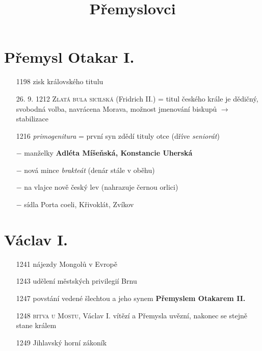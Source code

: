 \documentclass{article}
\title{\vspace{-2cm}Přemyslovci\vspace{-1.7cm}}
\date{}
\author{}
\begin{document}
\maketitle
\section*{Přemysl Otakar I.}
\begin{itemize}
    \vspace{-0.5em}
    \setlength\itemsep{0.15em}
    \item[1198] zisk královského titulu
    \item[26. 9. 1212] \textsc{Zlatá bula sicilská} (Fridrich II.) = titul českého krále je dědičný, svobodná volba, navrácena Morava, možnost jmenování biskupů $\rightarrow$ stabilizace
    \item[1216] \textit{primogenitura} = první syn zdědí tituly otce (dříve \textit{seniorát})
    \item[$-$] manželky \textbf{Adléta Míšeňská, Konstancie Uherská}
    \item[$-$] nová mince \textit{brakteát} (denár stále v oběhu)
    \item[$-$] na vlajce nově český lev (nahrazuje černou orlici)
    \item[$-$] sídla Porta coeli, Křivoklát, Zvíkov
\end{itemize}

\section*{Václav I.}
\begin{itemize}
    \vspace{-0.5em}
    \setlength\itemsep{0.15em}
    \item[1241] nájezdy Mongolů v Evropě
    \item[1243] udělení městských privilegií Brnu
    \item[1247] povstání vedené šlechtou a jeho synem \textbf{Přemyslem Otakarem II.}
    \item[1248] \textsc{bitva u Mostu}, Václav I. vítězí a Přemysla uvězní, nakonec se stejně stane králem
    \item[1249] Jihlavský horní zákoník
\end{itemize}
\end{document}
